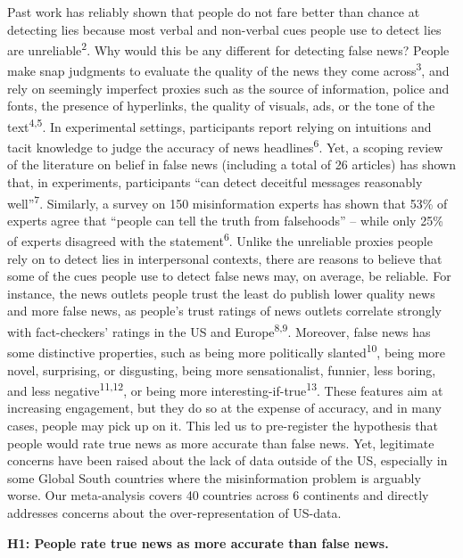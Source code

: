 \documentclass[
  doc,floatsintext]{apa6}
\begin{document}
Past work has reliably shown that people do not fare better than chance at detecting lies because most verbal and non-verbal cues people use to detect lies are unreliable\textsuperscript{2}. Why would this be any different for detecting false news? People make snap judgments to evaluate the quality of the news they come across\textsuperscript{3}, and rely on seemingly imperfect proxies such as the source of information, police and fonts, the presence of hyperlinks, the quality of visuals, ads, or the tone of the text\textsuperscript{4,5}. In experimental settings, participants report relying on intuitions and tacit knowledge to judge the accuracy of news headlines\textsuperscript{6}. Yet, a scoping review of the literature on belief in false news (including a total of 26 articles) has shown that, in experiments, participants ``can detect deceitful messages reasonably well''\textsuperscript{7}. Similarly, a survey on 150 misinformation experts has shown that 53\% of experts agree that ``people can tell the truth from falsehoods'' -- while only 25\% of experts disagreed with the statement\textsuperscript{6}. Unlike the unreliable proxies people rely on to detect lies in interpersonal contexts, there are reasons to believe that some of the cues people use to detect false news may, on average, be reliable. For instance, the news outlets people trust the least do publish lower quality news and more false news, as people's trust ratings of news outlets correlate strongly with fact-checkers' ratings in the US and Europe\textsuperscript{8,9}. Moreover, false news has some distinctive properties, such as being more politically slanted\textsuperscript{10}, being more novel, surprising, or disgusting, being more sensationalist, funnier, less boring, and less negative\textsuperscript{11,12}, or being more interesting-if-true\textsuperscript{13}. These features aim at increasing engagement, but they do so at the expense of accuracy, and in many cases, people may pick up on it. This led us to pre-register the hypothesis that people would rate true news as more accurate than false news. Yet, legitimate concerns have been raised about the lack of data outside of the US, especially in some Global South countries where the misinformation problem is arguably worse. Our meta-analysis covers 40 countries across 6 continents and directly addresses concerns about the over-representation of US-data.

\textbf{H1: People rate true news as more accurate than false news.}
\end{document}
